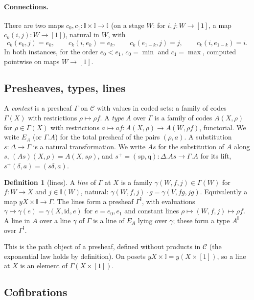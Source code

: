 \documentclass[11pt]{article}
\newcommand{\I}{\mathbb{I}}
\newcommand{\C}{\mathcal{C}}
\newcommand{\id}{\mathrm{id}}
\theoremstyle{plain}
\theoremstyle{definition}
\newtheorem{definition}[theorem]{Definition}
\theoremstyle{remark}
\begin{document}
\paragraph{Connections.} There are two maps
$c_0,c_1:\I\times\I\to\I$ (on a stage $W$: for $i,j:W\to[1]$, a map
$c_k(i,j):W\to[1]$), natural in $W$, with
\[
c_k(e_k,j)=e_k,\qquad c_k(i,e_k)=e_k,\qquad
c_k(e_{1-k},j)=j,\qquad c_k(i,e_{1-k})=i .
\]
In both instances, for the order $e_0<e_1$, $c_0=\min$ and $c_1=\max$,
computed pointwise on maps $W\to[1]$.

\subsection{Presheaves, types, lines}

A \emph{context} is a presheaf $\Gamma$ on $\C$ with values in coded
sets: a family of codes $\Gamma(X)$ with restrictions $\rho\mapsto\rho f$.
A \emph{type} $A$ over $\Gamma$ is a family of codes $A(X,\rho)$ for
$\rho\in\Gamma(X)$ with restrictions $a\mapsto af:A(X,\rho)\to
A(W,\rho f)$, functorial. We write $E_A$ (or $\Gamma.A$) for the total
presheaf of the pairs $(\rho,a)$. A substitution $s:\Delta\to\Gamma$ is a
natural transformation. We write $As$ for the substitution of $A$ along
$s$, $(As)(X,\rho)=A(X,s\rho)$, and
$s^+=(s\mathrm{p},\mathrm{q}):\Delta.As\to\Gamma.A$ for its lift,
$s^+(\delta,a)=(s\delta,a)$.

\begin{definition}[lines]
A \emph{line} of $\Gamma$ at $X$ is a family $\gamma(W,f,j)\in\Gamma(W)$
for $f:W\to X$ and $j\in\I(W)$, natural:
$\gamma(W,f,j)\cdot g=\gamma(V,fg,jg)$. Equivalently a map
$yX\times\I\to\Gamma$. The lines form a presheaf $\Gamma^\I$, with
evaluations $\gamma\mapsto\gamma(e)=\gamma(X,\id,e)$ for $e=e_0,e_1$ and
constant lines $\rho\mapsto(W,f,j)\mapsto\rho f$. A line in $A$ over a
line $\gamma$ of $\Gamma$ is a line of $E_A$ lying over $\gamma$; these
form a type $A^\I$ over $\Gamma^\I$.
\end{definition}

This is the path object of a presheaf, defined without products in $\C$
(the exponential law holds by definition). On posets $yX\times\I=y(X\times[1])$,
so a line at $X$ is an element of $\Gamma(X\times[1])$.

\subsection{Cofibrations}
\end{document}
